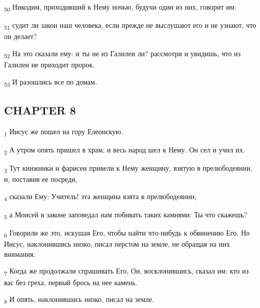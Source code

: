 \begin{tcolorbox}
\textsubscript{50} Никодим, приходивший к Нему ночью, будучи один из них, говорит им:
\end{tcolorbox}
\begin{tcolorbox}
\textsubscript{51} судит ли закон наш человека, если прежде не выслушают его и не узнают, что он делает?
\end{tcolorbox}
\begin{tcolorbox}
\textsubscript{52} На это сказали ему: и ты не из Галилеи ли? рассмотри и увидишь, что из Галилеи не приходит пророк.
\end{tcolorbox}
\begin{tcolorbox}
\textsubscript{53} И разошлись все по домам.
\end{tcolorbox}
\subsection{CHAPTER 8}
\begin{tcolorbox}
\textsubscript{1} Иисус же пошел на гору Елеонскую.
\end{tcolorbox}
\begin{tcolorbox}
\textsubscript{2} А утром опять пришел в храм, и весь народ шел к Нему. Он сел и учил их.
\end{tcolorbox}
\begin{tcolorbox}
\textsubscript{3} Тут книжники и фарисеи привели к Нему женщину, взятую в прелюбодеянии, и, поставив ее посреди,
\end{tcolorbox}
\begin{tcolorbox}
\textsubscript{4} сказали Ему: Учитель! эта женщина взята в прелюбодеянии;
\end{tcolorbox}
\begin{tcolorbox}
\textsubscript{5} а Моисей в законе заповедал нам побивать таких камнями: Ты что скажешь?
\end{tcolorbox}
\begin{tcolorbox}
\textsubscript{6} Говорили же это, искушая Его, чтобы найти что-нибудь к обвинению Его. Но Иисус, наклонившись низко, писал перстом на земле, не обращая на них внимания.
\end{tcolorbox}
\begin{tcolorbox}
\textsubscript{7} Когда же продолжали спрашивать Его, Он, восклонившись, сказал им: кто из вас без греха, первый брось на нее камень.
\end{tcolorbox}
\begin{tcolorbox}
\textsubscript{8} И опять, наклонившись низко, писал на земле.
\end{tcolorbox}
